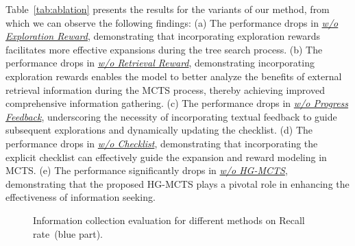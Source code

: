 Table~\ref{tab:ablation} presents the results for the variants of our method, from which we can observe the following findings: 
(a) The performance drops in \underline{\textit{w/o Exploration Reward}}, demonstrating that incorporating exploration rewards facilitates more effective expansions during the tree search process. 
(b) The performance drops in \underline{\textit{w/o Retrieval Reward}}, demonstrating incorporating exploration rewards enables the model to better analyze the benefits of external retrieval information during the MCTS process, thereby achieving improved comprehensive information gathering.
(c) The performance drops in \underline{\textit{w/o Progress Feedback}}, underscoring the necessity of incorporating textual feedback to guide subsequent explorations and dynamically updating the checklist.
(d) The performance drops in \underline{\textit{w/o Checklist}}, demonstrating that incorporating the explicit checklist can effectively guide the expansion and reward modeling in MCTS.
(e) The performance significantly drops in \underline{\textit{w/o HG-MCTS}}, demonstrating that the proposed HG-MCTS plays a pivotal role in enhancing the effectiveness of information seeking.

\begin{table}[t]
    \centering
    \small
{}
    \caption{Evaluation results of the proposed method's variants on FanoutQA.}
    \label{tab:ablation}
\end{table}

\begin{figure}[t!]
    \centering
    \hspace{0.02\textwidth} 
    \caption{Information collection evaluation for different methods on Recall rate~(blue part).}
    \label{fig:recall}
\end{figure}

